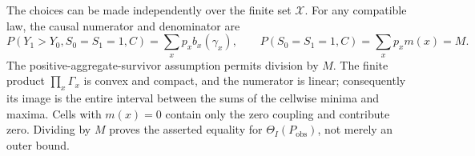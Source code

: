 The choices can be made independently over the finite set \(\mathcal X\).  For any compatible law, the causal numerator and denominator are
\[
P(Y_1>Y_0,S_0=S_1=1,C)=\sum_xp_xb_x(\gamma_x),\qquad
P(S_0=S_1=1,C)=\sum_xp_xm(x)=M.
\]
The positive-aggregate-survivor assumption permits division by \(M\).  The finite product \(\prod_x\Gamma_x\) is convex and compact, and the numerator is linear; consequently its image is the entire interval between the sums of the cellwise minima and maxima.  Cells with \(m(x)=0\) contain only the zero coupling and contribute zero.  Dividing by \(M\) proves the asserted equality for \(\Theta_I(P_{\mathrm{obs}})\), not merely an outer bound.